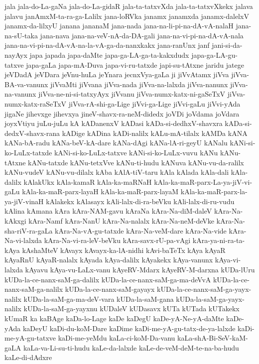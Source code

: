 {jala
jala-do-La-gaNa
jala-do-La-gidaR
jala-ta-tatxvXda
jala-ta-tatxvXkekx
jalava
jalavu
janAmxM-ta-ra-ga-Lalilx
jana-loRVka
janamx
janamxda
janamx-dalelxV
janamx-da-lilxyU
janana
jananaM
jana-nada
jana-na-li-pi-na-dA-vA-nalaH
jana-na-sU-taka
jana-nava
jana-na-veV-nA-da-DA-gali
jana-na-vi-pi-na-dA-vA-nala
jana-na-vi-pi-na-dA-vA-na-la-vA-ga-da-nanxkakx
jana-ranUnx
janf
jani-si-da-nayAyx
japa
japada
japa-daMte
japa-ga-LA-ga-ta-kakxdudx
japa-ga-LA-gu-tatxve
japa-gaLa
japa-mA-Duva
japa-vi-ru-tatxde
japi-su-tAtxne
jaridu
jatege
jeVDadA
jeVDara
jeVnu-huLa
jeYnara
jecnxVya-gaLa
ji
jiVvAtamx
jiVva
jiVva-BA-va-vanunx
jiVvaMti
jiVvana
jiVva-nada
jiVva-na-lalxda
jiVva-nanunx
jiVva-na-vanunx
jiVva-ne-ni-si-tatxyAyx
jiVvanu
jiVva-numx-katx-ni-gaSeTxV
jiVva-numx-katx-raSeTxV
jiVva-rA-shi-ga-Lige
jiVvi-ga-Lige
jiVvi-gaLu
jiVvi-yAda
jigaNe
jihevxge
jihevxya
jineV-shavx-ra-neM-didedx
joVDi
joVdama
joVdara
joyxVtiyu
juLu-juLu
kA
kADanenxV
kADasi
kADa-si-dedhxV-shavxra
kADa-si-dedxV-shavx-rana
kADige
kADina
kADi-nalilx
kALu-mA-tilalx
kAMDa
kANA
kANa-bA-radu
kANa-beV-kA-dare
kANa-dAgi
kANa-lA-ri-geyU
kANalu
kANi-si-ko-LuLx-tatxde
kANi-si-ko-LuLx-tatxve
kANi-si-ko-LuLx-vuvu
kANu
kANu-tAtxne
kANu-tatxde
kANu-tetxVve
kANu-ti-hudu
kANuva
kANu-vu-da-ralilx
kANu-vudeV
kANu-vu-dilalx
kAba
kAlA-tiV-taru
kAla
kAlada
kAla-dali
kAla-dalilx
kAlakUkx
kAla-kamaR
kAla-ka-maRNaH
kAla-ka-maR-parx-La-ya-jiV-vi-gaLu
kAla-ka-maR-parx-layaH
kAla-ka-maR-parx-layaM
kAla-ka-maR-parx-la-ya-jiV-vinaH
kAlakekx
kAlasayx
kAli-lalx-di-ra-beVku
kAli-lalx-di-ru-vudu
kAlina
kAmana
kAra
kAra-NAM-gavu
kAraNa
kAra-Na-diM-daleV
kAra-Na-kAkxgi
kAra-Namf
kAra-NanU
kAra-Na-nalalx
kAra-Na-neM-deVke
kAra-Na-sha-riV-ra-gaLa
kAra-Na-vA-gu-tatxde
kAra-Na-veM-dare
kAra-Na-vide
kAra-Na-vi-lalxda
kAra-Na-vi-ra-leV-beVku
kAra-savx-rU-pa-vAgi
kAra-ya-ni-ra-ta-kAya
kAshaMteV
kAvayx
kAvayx-ka-lA-nidhi
kAvi-baTeTx
kAya
kAyaR
kAyaRnU
kAyaR-nalalx
kAyada
kAya-dalilx
kAyakekx
kAya-vanunx
kAya-vi-lalxda
kAyavu
kAya-vu-LaLx-vanu
kAyeRV-Mdarx
kAyeRV-M-darxna
kUDa-lUru
kUDa-la-ce-nanx-saM-ga-dalilx
kUDa-la-ce-nanx-saM-ga-ma-deVvA
kUDa-la-ce-nanx-saM-ga-nalilx
kUDa-la-ce-nanx-saM-gayayx
kUDa-la-ce-nanx-saM-ga-yayx-nalilx
kUDa-la-saM-ga-ma-deV-vara
kUDa-la-saM-gana
kUDa-la-saM-ga-yayx-nalilx
kUDa-la-saM-ga-yayxnu
kUDaleV
kUDasavx
kUTa
kUTada
kUTakekx
kUmaR
ka
kaBAge
kaDa-lo-Lage
kaDe
kaDegU
kaDe-yA-Ne-yA-daMte
kaDe-yAda
kaDeyU
kaDi-du-koM-Dare
kaDime
kaDi-me-yA-gu-tatx-de-ya-lalxde
kaDi-me-yA-gu-tatxve
kaDi-me-yeMdu
kaLa-ci-koM-Da-vanu
kaLa-shA-Bi-SeV-kaM-gaLA
kaLa-va-Li-su-ti-hudu
kaLe-da-lalxde
kaLe-de-veM-deM-te-na-ba-hudu
kaLe-di-dAdxre
}
